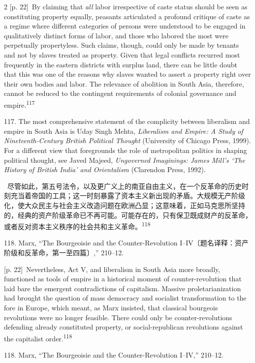 \documentclass[10pt,a4paper]{article}
\begin{document}
\begin{paracol}{2}
\switchcolumn
{\scriptsize\color{gray} [p. 22]}\ By claiming that \textit{all} labor irrespective of caste status should be seen as constituting property equally, peasants articulated a profound critique of caste as a regime where different categories of persons were understood to be engaged in qualitatively distinct forms of labor, and those who labored the most were perpetually propertyless. Such claims, though, could only be made by tenants and not by slaves treated as property. Given that legal conflicts recurred most frequently in the eastern districts with surplus land, there can be little doubt that this was one of the reasons why slaves wanted to assert a property right over their own bodies and labor. The relevance of abolition in South Asia, therefore, cannot be reduced to the contingent requirements of colonial governance and empire.\nobreak\textsuperscript{117}\par{\small 117. The most comprehensive statement of the complicity between liberalism and empire in South Asia is Uday Singh Mehta, \textit{Liberalism and Empire: A Study of Nineteenth-Century British Political Thought} (University of Chicago Press, 1999). For a different view that foregrounds the role of metropolitan politics in shaping political thought, see Javed Majeed, \textit{Ungoverned Imaginings: James Mill’s ‘The History of British India’ and Orientalism} (Clarendon Press, 1992).\par}
\switchcolumn*
{\scriptsize\color{gray} [p. 22]}\ 尽管如此，第五号法令，以及更广义上的南亚自由主义，在一个反革命的历史时刻充当着帝国的工具；这一时刻暴露了资本主义新出现的矛盾。大规模无产阶级化，使大众民主与社会主义改造问题在欧洲凸显；这意味着，正如马克思所坚持的，经典的资产阶级革命已不再可能。可能存在的，只有保卫既成财产的反革命，或者反对资本主义秩序的社会共和主义革\mbox{命。\textsuperscript{118}}\par{\small 118. Marx, “The Bourgeoisie and the Counter-Revolution I–IV〔题名译释：资产阶级和反革命，第一至四篇〕,” 210–12.\par}
\switchcolumn
{\scriptsize\color{gray} [p. 22]}\ Nevertheless, Act V, and liberalism in South Asia more broadly, functioned as tools of empire in a historical moment of counter-revolution that laid bare the emergent contradictions of capitalism. Massive proletarianization had brought the question of mass democracy and socialist transformation to the fore in Europe, which meant, as Marx insisted, that classical bourgeois revolutions were no longer feasible. There could only be counter-revolutions defending already constituted property, or social-republican revolutions against the capitalist order.\nobreak\textsuperscript{118}\par{\small 118. Marx, “The Bourgeoisie and the Counter-Revolution I–IV,” 210–12.\par}

\end{paracol}
\end{document}
